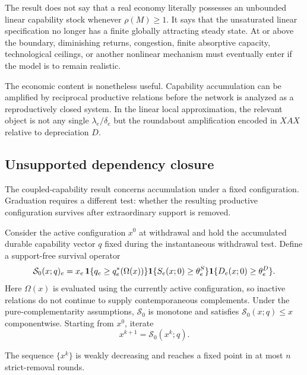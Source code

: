 The result does not say that a real economy literally possesses an unbounded linear capability stock whenever $\rho(M)\ge1$. It says that the unsaturated linear specification no longer has a finite globally attracting steady state. At or above the boundary, diminishing returns, congestion, finite absorptive capacity, technological ceilings, or another nonlinear mechanism must eventually enter if the model is to remain realistic.

The economic content is nonetheless useful. Capability accumulation can be amplified by reciprocal productive relations before the network is analyzed as a reproductively closed system. In the linear local approximation, the relevant object is not any single $\lambda_e/\delta_e$ but the roundabout amplification encoded in $XAX$ relative to depreciation $D$.

\subsection{Unsupported dependency closure}

The coupled-capability result concerns accumulation under a fixed configuration. Graduation requires a different test: whether the resulting productive configuration survives after extraordinary support is removed.

Consider the active configuration $x^0$ at withdrawal and hold the accumulated durable capability vector $q$ fixed during the instantaneous withdrawal test. Define a support-free survival operator
\begin{equation}
\mathcal S_0(x;q)_e
=
x_e\,
\mathbf{1}\{q_e\ge q_e^*(\Omega(x))\}
\mathbf{1}\{S_e(x;0)\ge\theta_e^S\}
\mathbf{1}\{D_e(x;0)\ge\theta_e^D\}.
\label{eq:survival-operator}
\end{equation}
Here $\Omega(x)$ is evaluated using the currently active configuration, so inactive relations do not continue to supply contemporaneous complements. Under the pure-complementarity assumptions, $\mathcal S_0$ is monotone and satisfies $\mathcal S_0(x;q)\le x$ componentwise. Starting from $x^0$, iterate
\begin{equation}
x^{k+1}=\mathcal S_0(x^k;q).
\end{equation}

\begin{lemma}
\label{lem:closure}
The sequence $\{x^k\}$ is weakly decreasing and reaches a fixed point in at most $n$ strict-removal rounds.
\end{lemma}

